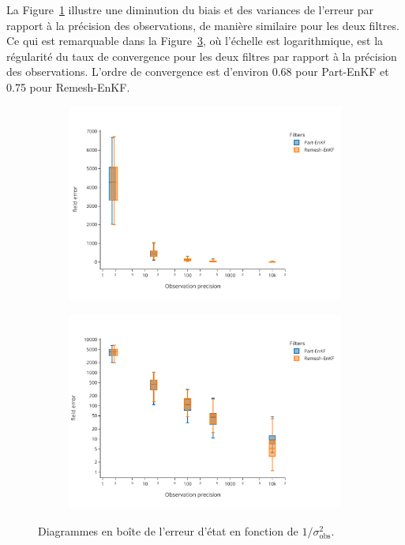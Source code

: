 La Figure~\ref{fig:obs_precision_1} illustre une diminution du biais et des variances de l'erreur par rapport à la précision des observations, de manière similaire pour les deux filtres. Ce qui est remarquable dans la Figure~\ref{fig:obs_precision_2}, où l'échelle est logarithmique, est la régularité du taux de convergence pour les deux filtres par rapport à la précision des observations. L'ordre de convergence est d'environ 0.68 pour Part-EnKF et 0.75 pour Remesh-EnKF.

\begin{figure}[h!]
    \centering
    \begin{subfigure}{0.49\linewidth}
        \centering
        \includegraphics[width=\linewidth]{./images/app2d/final/MSE_obs_precision_box.pdf}
        \caption{}
        \label{fig:obs_precision_1}
    \end{subfigure}
    \begin{subfigure}{0.49\linewidth}
        \centering
        \includegraphics[width=\linewidth]{./images/app2d/final/MSE_obs_precision_box_log.pdf}
        \caption{}
        \label{fig:obs_precision_2}
    \end{subfigure}
    \caption{Diagrammes en boîte de l'erreur d'état en fonction de \(1/\sigma_{\text{obs}}^2\).}
\end{figure}


